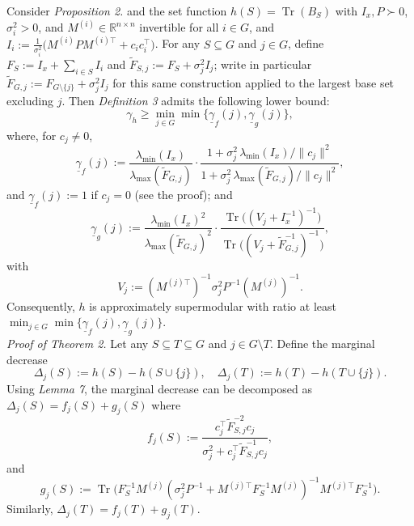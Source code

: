\documentclass[letterpaper, 10 pt, conference]{ieeeconf}  %
\begin{document}
Consider \textit{Proposition 2.} and the set function
$h(S)=\operatorname{Tr}(B_S)$ with \(I_x, P\succ 0\), \(\sigma_i^2>0\), and \(M^{(i)}\in\mathbb R^{n\times n}\) invertible for all \(i\in G\), and $I_i:=\frac{1}{\sigma_i^2}
\Big(M^{(i)} P M^{(i)\top}+c_i c_i^\top\Big)$.
For any \(S\subseteq G\) and \(j\in G\), define $F_S:=I_x+\sum_{i\in S}I_i$ and $\widetilde F_{S,j}:=F_S+\sigma_j^2 I_j$; write in particular $\widetilde F_{G,j}:=F_{G\setminus\{j\}}+\sigma_j^2 I_j$ for this same construction applied to the largest base set excluding $j$. Then \textit{Definition 3}
admits the following lower bound:
\begin{equation}
\label{eq:gamma_lower_main}
\gamma_h \ge \min_{j\in G}\min\{\underline\gamma_f(j),\underline\gamma_g(j)\},
\end{equation}
where, for \(c_j\neq 0\),
\begin{equation}
\label{eq:gamma_f_part}
\underline\gamma_f(j)
:=
\frac{\lambda_{\min}(I_x)}{\lambda_{\max}(\widetilde F_{G,j})}
\cdot
\frac{
1+\sigma_j^2\,\lambda_{\min}(I_x)/\|c_j\|^2
}{
1+\sigma_j^2\,\lambda_{\max}(\widetilde F_{G,j})/\|c_j\|^2
},
\end{equation}
and \(\underline\gamma_f(j):=1\) if \(c_j=0\) (see the proof); and
\begin{equation}
\label{eq:gamma_g_part}
\underline\gamma_g(j)
:=
\frac{\lambda_{\min}(I_x)^2}{\lambda_{\max}(\widetilde F_{G,j})^2}
\cdot
\frac{
\operatorname{Tr}\!\big((V_j+I_x^{-1})^{-1}\big)
}{
\operatorname{Tr}\!\big((V_j+\widetilde F_{G,j}^{-1})^{-1}\big)
},
\end{equation}
with
\[
V_j:=(M^{(j)\top})^{-1}\sigma_j^2P^{-1}(M^{(j)})^{-1}.
\]
Consequently, \(h\) is approximately supermodular with ratio at least \(\min_{j\in G}\min\{\underline\gamma_f(j),\underline\gamma_g(j)\}\). \\

\noindent \textit{Proof of Theorem 2.}
Let any \(S\subseteq T\subseteq G\) and \(j\in G\setminus T\). Define the marginal decrease
\[
\Delta_j(S):=h(S)-h(S\cup\{j\}),
\quad
\Delta_j(T):=h(T)-h(T\cup\{j\}).
\]
Using \textit{Lemma 7}, the marginal decrease can be decomposed \cite{c20} as  $\Delta_j(S)=f_j(S)+g_j(S)$ where
\[
f_j(S):=
\frac{c_j^\top \widetilde F_{S,j}^{-2}c_j}
{\sigma_j^2+c_j^\top \widetilde F_{S,j}^{-1}c_j},
\]
and
\[
g_j(S):=
\operatorname{Tr}\!\Big( \!
F_S^{-1}M^{(j)}
(\sigma_j^2P^{-1}\!+M^{(j)\top}F_S^{-1}M^{(j)})^{-1}
M^{(j)\top}\!F_S^{-1}
\Big).
\]
Similarly, $\Delta_j(T)=f_j(T)+g_j(T).$ \\
\end{document}
